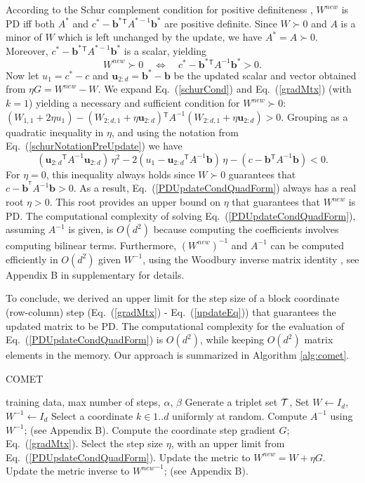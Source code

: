 \documentclass{article} %
\newcommand\mat[1]{{#1}}
\renewcommand\vec[1]{\mathbf{#1}}
\newcommand{\T}{{}^\mathsf{T}}
\newcommand{\W}{\mat{W}}
\newcommand{\newW}{{\mat{W^{new}}}}
\newcommand{\B}{\vec{b}}
\newcommand{\C}{c}
\newcommand{\invA}{A^{-1}}
\newcommand{\uscalar}{{u}_{1}}
\newcommand{\uvec}{\vec{u}_{2:d}}
\newcommand{\Wvec}{\W_{2:d,1}}
\newcommand{\Wscalar}{\W_{1,1}}
\renewcommand{\eqref}[1]{Eq.~(\ref{#1})}
\begin{document}
According to the Schur complement condition for positive definiteness
\citep[p. 650]{boyd2004convex}, $\newW$ is PD iff both
$A^*$ and $\C^* - \B^*\T A^{*-1} \B^*$ are positive definite.
Since $W \succ 0$ and $A$ is a minor of $\W$ which is left unchanged by the update, we have $A^* =
A \succ 0$. Moreover, $\C^* - \B^*\T A^{*-1} \B^*$ is a
scalar, yielding
\begin{equation}
  \newW \succ  0 \quad \Leftrightarrow \quad  \C^* - \B^*\T \invA \B^* >  0.
  \label{schurCond}
\end{equation}
Now let $\uscalar = \C^* - \C$ and $\uvec = \B^* - \B$ be the updated scalar and vector
obtained from $\eta G = \newW - \W$. We expand \eqref{schurCond} and
\eqref{gradMtx} (with $k=1$) yielding a necessary and sufficient condition for $\newW \succ 0$: $(\Wscalar + 2\eta \uscalar)-(\Wvec + \eta \uvec)\T \invA (\Wvec + \eta \uvec)   > 0$.
Grouping as a quadratic inequality in $\eta$, and using the notation from \eqref{schurNotationPreUpdate} we have
\begin{equation}
\label{PDUpdateCondQuadForm}
(\uvec\T \invA \uvec) \, \eta^2 
-2(\uscalar - \uvec\T \invA \B) \,\eta 
-(\C - \B\T  \invA \B) < 0 .
\end{equation}
For $\eta = 0$, this inequality always
holds since $\W \succ 0$ guarantees that $\C-\B^{\T} \invA \B >0$. As a result,
 \eqref{PDUpdateCondQuadForm} always has a real
root $\eta > 0$. This root provides an upper bound on $\eta$ that guarantees that $\newW$ is PD. The computational complexity of solving \eqref{PDUpdateCondQuadForm}, assuming $\invA$ is given, is $O(d^2)$ because computing the coefficients involves computing bilinear terms.
Furthermore, $(\newW)^{-1}$ and $\invA$ can be computed efficiently in $O(d^2)$ given $\W^{-1}$, using the Woodbury inverse matrix identity \cite{woodbury1950inverting}, see Appendix B in supplementary for details.

To conclude, we derived an upper limit for the step size of a block coordinate (row-column) step (\eqref{gradMtx} - \eqref{updateEq}) that guarantees  the updated matrix to be PD. The computational complexity for the evaluation
of \eqref{PDUpdateCondQuadForm} is $O(d^2)$, while keeping $O(d^2)$ matrix elements in the memory.
Our approach is summarized in Algorithm \ref{alg:comet}.
\begin{algorithm}[tb]
   \caption{COMET}
   \label{alg:comet}
\begin{algorithmic}[1]
    training data, max number of steps, $\alpha$, $\beta$
   \STATE Generate a triplet set $\cal{T}$, Set  $\W  \leftarrow I_d$, $\W^{-1}  \leftarrow I_d$
   \REPEAT 
   \STATE Select a coordinate $k \in {1..d}$ uniformly at random.
   \STATE Compute $\invA$ using $\W^{-1}$; (see Appendix B).
   \STATE Compute the coordinate step gradient $G$; \eqref{gradMtx}.
   \STATE Select the step size $\eta$, with an upper limit from \eqref{PDUpdateCondQuadForm}.
   \STATE Update the metric to $\newW=\W+\eta G$.
   \STATE Update the metric inverse to $\newW^{-1}$; (see Appendix B).
\end{algorithmic}
\end{algorithm}
\end{document}
